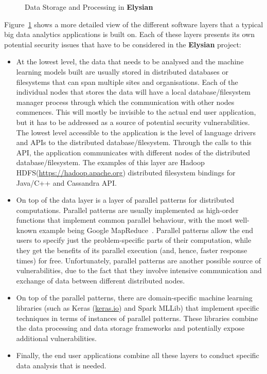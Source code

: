 \documentclass[a4paper,11pt]{article}
\newcommand{\project}[1]{\textbf{#1}\xspace}
\newcommand{\SECURITY}{\project{Elysian}}
\newcommand{\TheProject}{\SECURITY}
\begin{document}
\begin{figure}[tph!]
  \begin{center}
  \vspace{-19mm}
  \vspace{-2.3cm}
  \caption{Data Storage and Processing in \TheProject{}}
  \label{fig:storageprocessing}
  \end{center}
  \end{figure}

Figure~\ref{fig:storageprocessing} shows a more detailed view of the different software layers that a typical big data analytics applications is built on. Each of these layers presents its own potential security issues that have to be considered in the \TheProject{} project: 
\begin{itemize}
\item At the lowest level, the data that needs to be analysed and the machine learning models built are usually stored in distributed databases or filesystems that can span multiple sites and organisations. Each of the individual nodes that stores the data will have a local database/filesystem manager process through which the communication with other nodes commences. This will mostly be invisible to the actual end user application, but it has to be addressed as a source of potential security vulnerabilities. The lowest level accessible to the application is the level of language drivers and APIs to the distributed database/filesystem. Through the calls to this API, the application communicates with different nodes of the distributed database/filesystem. The examples of this layer are Hadoop HDFS(\url{https://hadoop.apache.org}) distributed filesystem bindings for Java/C++ and Cassandra API. 
\item On top of the data layer is a layer of parallel patterns for distributed computations. Parallel patterns are usually implemented as high-order functions that implement common parallel behaviour, with the most well-known example being Google MapReduce~\cite{mapreduce}. Parallel patterns allow the end users to specify just the problem-specific parts of their computation, while they get the benefits of its parallel execution (and, hence, faster response times) for free. Unfortunately, parallel patterns are another possible source of vulnerabilities, due to the fact that they involve intensive communication and exchange of data between different distributed nodes. 
\item On top of the parallel patterns, there are domain-specific machine learning libraries (such as Keras (\url{keras.io}) and Spark MLLib) that implement specific %
techniques in terms of instances of parallel patterns. These libraries combine the data processing and data storage frameworks and potentially expose additional vulnerabilities. 
\item Finally, the end user applications combine all these layers to conduct specific data analysis that is needed. 
\end{itemize}
\end{document}
